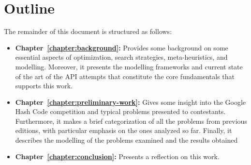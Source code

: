 \section{Outline}
\label{section:outline}

The remainder of this document is structured as follows:

\begin{itemize}
      \item \textbf{Chapter~\ref{chapter:background}:} Provides some background
            on some essential aspects of optimization, search strategies,
            meta-heuristics, and modelling. Moreover, it presents the modelling
            frameworks and current state of the art of the API attempts that
            constitute the core fundamentals that~\cite{outeiro2021application}
            supports this work.

      \item \textbf{Chapter~\ref{chapter:preliminary-work}:}
            Gives some insight into the Google Hash Code competition and typical
            problems presented to contestants. Furthermore, it makes a brief
            categorization of all the problems from previous editions, with particular
            emphasis on the ones analyzed so far. Finally, it describes the modelling
            of the problems examined and the results obtained


      \item \textbf{Chapter~\ref{chapter:conclusion}:} Presents a reflection on this work.
\end{itemize}

